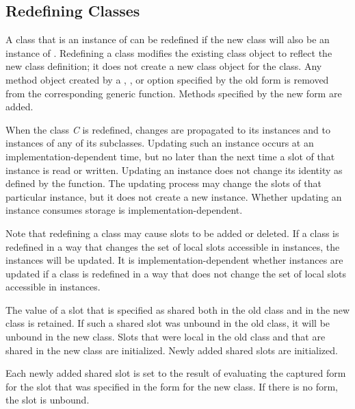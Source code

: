 \subsection{Redefining Classes}  
\label{Redefining-Classes-SECTION}  

A class that is an instance of  can be redefined
if the new class will also be an instance of .
Redefining a class modifies the existing class object to reflect the
new class definition; it does not create a new class object for the
class.  Any method object created by a , , or
 option specified by the old  form is
removed from the corresponding generic function.
Methods specified by the new  form are added.


When the class \emph{C} is redefined, changes are propagated to its instances
and to instances of any of its subclasses.  Updating such an
instance occurs at an implementation-dependent time, but no later than
the next time a slot of that instance is read or written.  Updating an
instance does not change its identity as defined by the 
function.  The updating process may change the slots of that
particular instance, but it does not create a new instance.  Whether
updating an instance consumes storage is implementation-dependent.

Note that redefining a class may cause slots to be added or deleted.
If a class is redefined in a way that changes the set of local slots
accessible in instances, the instances will be updated.  It is
implementation-dependent whether instances are updated if a class is
redefined in a way that does not change the set of local slots
accessible in instances.

The value of a slot that is specified as shared both in the old class
and in the new class is retained.  If such a shared slot was unbound
in the old class, it will be unbound in the new class.  Slots that
were local in the old class and that are shared in the new class are
initialized.  Newly added shared slots are initialized.

Each newly added shared slot is set to the result of evaluating the
captured  form for the slot that was specified in the
 form for the new class. If there is no 
form, the slot is unbound.

